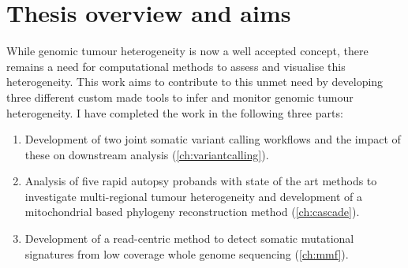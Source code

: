 \section{Thesis overview and aims}
\label{intro-sec:overview}

While genomic tumour heterogeneity is now a well accepted concept, there remains a need for computational methods to assess and visualise this heterogeneity. This work aims to contribute to this unmet need by developing three different custom made tools to infer and monitor genomic tumour heterogeneity. I have completed the work in the following three parts:

\begin{enumerate}
	\item Development of two joint somatic variant calling workflows and the impact of these on downstream analysis (\autoref{ch:variantcalling}). 
	\item Analysis of five rapid autopsy probands with state of the art methods to investigate multi-regional tumour heterogeneity and development of a mitochondrial based phylogeny reconstruction method (\autoref{ch:cascade}). 
	\item Development of a read-centric method to detect somatic mutational signatures from low coverage whole genome sequencing (\autoref{ch:mmf}).
\end{enumerate}